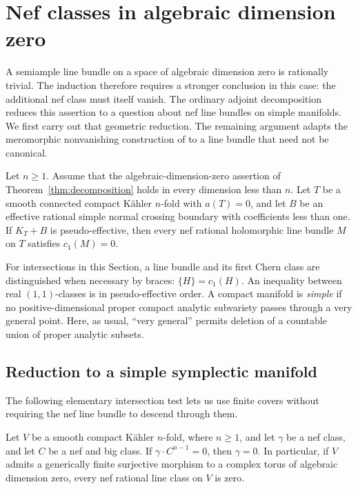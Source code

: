 \section{Nef classes in algebraic dimension zero}\label{sec:zero}

A semiample line bundle on a space of algebraic dimension zero is
rationally trivial.  The induction therefore requires a stronger
conclusion in this case: the additional nef class must itself vanish.
The ordinary adjoint decomposition reduces this assertion to a question
about nef line bundles on simple manifolds.  We first carry out that
geometric reduction.  The remaining argument adapts the meromorphic
nonvanishing construction of \cite[Section~6]{K} to a line bundle that
need not be canonical.

\begin{proposition}\label{zero:vanishing}
Let \(n\ge1\).  Assume that the algebraic-dimension-zero assertion of
Theorem~\ref{thm:decomposition} holds in every dimension less than \(n\).
Let \(T\) be a smooth connected compact Kähler \(n\)-fold with
\(a(T)=0\), and let \(B\) be an effective rational simple normal crossing
boundary with coefficients less than one.  If \(K_T+B\) is
pseudo-effective, then every nef rational holomorphic line bundle \(M\)
on \(T\) satisfies \(c_1(M)=0\).
\end{proposition}

For intersections in this Section, a line bundle and its first Chern
class are distinguished when necessary by braces: \(\{H\}=c_1(H)\).
An inequality between real \((1,1)\)-classes is in pseudo-effective
order.  A compact manifold is \emph{simple} if no positive-dimensional
proper compact analytic subvariety passes through a very general point.
Here, as usual, ``very general'' permits deletion of a countable union
of proper analytic subsets.

\subsection{Reduction to a simple symplectic manifold}

The following elementary intersection test lets us use finite covers
without requiring the nef line bundle to descend through them.

\begin{lemma}\label{zero:mass-test}
Let \(V\) be a smooth compact Kähler \(n\)-fold, where \(n\ge1\),
and let \(\gamma\) be a nef
class, and let \(C\) be a nef and big class.  If
\(\gamma\cdot C^{n-1}=0\), then \(\gamma=0\).
In particular, if \(V\) admits a generically finite surjective morphism
to a complex torus of algebraic dimension zero, every nef rational line
class on \(V\) is zero.
\end{lemma}

